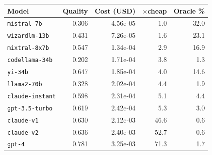 \begin{tabular}{lrrrr}
\toprule
Model & Quality & Cost (USD) & $\times$cheap & Oracle \% \\
\midrule
\texttt{mistral-7b} & 0.306 & 4.56e-05 & 1.0 & 32.0 \\
\texttt{wizardlm-13b} & 0.431 & 7.26e-05 & 1.6 & 23.1 \\
\texttt{mixtral-8x7b} & 0.547 & 1.34e-04 & 2.9 & 16.9 \\
\texttt{codellama-34b} & 0.202 & 1.71e-04 & 3.8 & 1.3 \\
\texttt{yi-34b} & 0.647 & 1.85e-04 & 4.0 & 14.6 \\
\texttt{llama2-70b} & 0.328 & 2.02e-04 & 4.4 & 1.9 \\
\texttt{claude-instant} & 0.598 & 2.31e-04 & 5.1 & 4.4 \\
\texttt{gpt-3.5-turbo} & 0.619 & 2.42e-04 & 5.3 & 3.0 \\
\texttt{claude-v1} & 0.630 & 2.12e-03 & 46.6 & 0.6 \\
\texttt{claude-v2} & 0.636 & 2.40e-03 & 52.7 & 0.6 \\
\texttt{gpt-4} & 0.781 & 3.25e-03 & 71.3 & 1.7 \\
\bottomrule
\end{tabular}